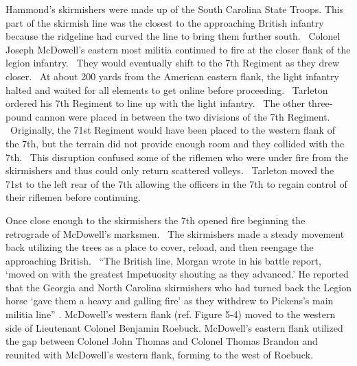 Hammond's skirmishers were made up of the South Carolina State Troops.  This
part of the skirmish line was the closest to the approaching British infantry
because the ridgeline had curved the line to bring them further south.  Colonel
Joseph McDowell’s eastern most militia continued to fire at the closer flank of
the legion infantry.  They would eventually shift to the 7th Regiment as they
drew closer.  At about 200 yards from the American eastern flank, the light
infantry halted and waited for all elements to get online before proceeding.
 Tarleton ordered his 7th Regiment to line up with the light infantry.  The
other three-pound cannon were placed in between the two divisions of the 7th
Regiment.  Originally, the 71st Regiment would have been placed to the western
flank of the 7th, but the terrain did not provide enough room and they collided
with the 7th.  This disruption confused some of the riflemen who were under fire
from the skirmishers and thus could only return scattered volleys.  Tarleton
moved the 71st to the left rear of the 7th allowing the officers in the 7th to
regain control of their riflemen before continuing.

Once close enough to the skirmishers the 7th opened fire beginning the
retrograde of McDowell’s marksmen.  The skirmishers made a steady movement back
utilizing the trees as a place to cover, reload, and then reengage the
approaching British.  “The British line, Morgan wrote in his battle report,
‘moved on with the greatest Impetuosity shouting as they advanced.’ He reported
that the Georgia and North Carolina skirmishers who had turned back the Legion
horse ‘gave them a heavy and galling fire’ as they withdrew to Pickens’s main
militia line” \cite[p.321]{buchanan_road_1997}.  McDowell’s western flank (ref. Figure 5-4)
moved to the western side of Lieutenant Colonel Benjamin Roebuck.  McDowell’s
eastern flank utilized the gap between Colonel John Thomas and Colonel Thomas
Brandon and reunited with McDowell’s western flank, forming to the west of
Roebuck. 



